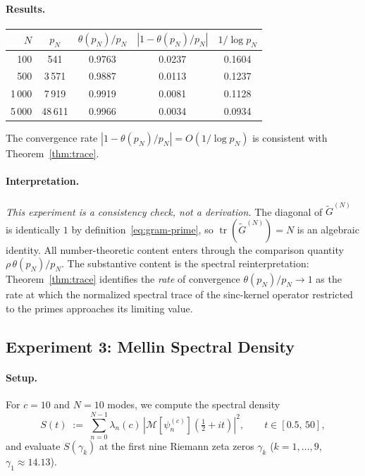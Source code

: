 \documentclass[12pt,a4paper]{amsart}
\theoremstyle{definition}
\newcommand{\tr}{\operatorname{tr}}
\begin{document}
\paragraph{Results.}
\begin{center}
\renewcommand{\arraystretch}{1.25}
\begin{tabular}{rcccc}
\hline
$N$ & $p_N$ & $\theta(p_N)/p_N$ & $|1 - \theta(p_N)/p_N|$
& $1/\log p_N$ \\
\hline
100 & 541 & 0.9763 & 0.0237 & 0.1604 \\
500 & 3\,571 & 0.9887 & 0.0113 & 0.1237 \\
1\,000 & 7\,919 & 0.9919 & 0.0081 & 0.1128 \\
5\,000 & 48\,611 & 0.9966 & 0.0034 & 0.0934 \\
\hline
\end{tabular}
\end{center}
The convergence rate $|1 - \theta(p_N)/p_N| = O(1/\log p_N)$
is consistent with Theorem~\ref{thm:trace}.

\paragraph{Interpretation.}
\emph{This experiment is a consistency check, not a derivation.}
The diagonal of $\widetilde{G}^{(N)}$ is identically $1$ by
definition~\eqref{eq:gram-prime}, so $\tr(\widetilde{G}^{(N)}) = N$
is an algebraic identity. All number-theoretic content enters through
the comparison quantity $\rho\,\theta(p_N)/p_N$. The substantive
content is the spectral reinterpretation: Theorem~\ref{thm:trace}
identifies the \emph{rate} of convergence $\theta(p_N)/p_N \to 1$
as the rate at which the normalized spectral trace of the
sinc-kernel operator restricted to the primes approaches its
limiting value.

\subsection{Experiment 3: Mellin Spectral Density}
\label{ssec:exp3}

\paragraph{Setup.}
For $c = 10$ and $N = 10$ modes, we compute the spectral density
\begin{equation}
\label{eq:spectral-density}
S(t)
\;:=\;
\sum_{n=0}^{N-1}
\lambda_n(c)\,
\left|\mathcal{M}[\psi_n^{(c)}]\!\left(\tfrac{1}{2}+it\right)\right|^2,
\qquad t \in [0.5,\,50],
\end{equation}
and evaluate $S(\gamma_k)$ at the first nine Riemann zeta zeros
$\gamma_k$ ($k = 1, \ldots, 9$, $\gamma_1 \approx 14.13$).
\end{document}
